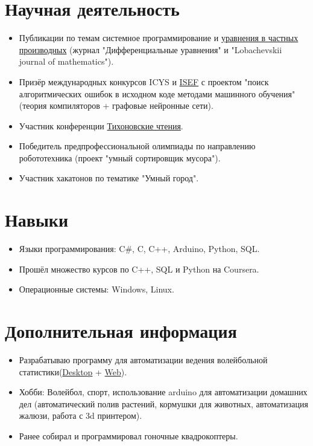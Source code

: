 \documentclass[a4paper,9pt]{article}
\begin{document}
	\section*{Научная деятельность}
	\begin{itemize}[left=0pt]
		\item Публикации по темам системное программирование и \href{https://journals.rcsi.science/0374-0641/issue/view/17906}{уравнения в частных производных} (журнал "Дифференциальные уравнения" и "Lobachevskii journal of mathematics").
		\item Призёр международных конкурсов ICYS  и \href{https://partner.projectboard.world/isef/project/soft004---search-for-algorithmic-errors}{ISEF} с проектом "поиск алгоритмических ошибок в исходном коде методами машинного обучения"(теория компиляторов + графовые нейронные сети).
		\item Участник конференции \href{https://cs.msu.ru/sites/cmc/files/attachs/tihonovskie_chteniya_el._versiya_0.pdf}{Тихоновские чтения}.
		\item Победитель предпрофессиональной олимпиады по направлению робототехника (проект "умный сортировщик мусора").
		\item Участник хакатонов по тематике "Умный город".
	\end{itemize}
	
	
	\section*{Навыки}
	\begin{itemize}[left=0pt]
		\item Языки программирования: C$\#$, C, C++, Arduino, Python, SQL.
		\item Прошёл множество курсов по C++, SQL и Python на Coursera.
		\item Операционные системы: Windows, Linux.
	\end{itemize}
	
	\section*{Дополнительная информация}
	\begin{itemize}[left=0pt]
		\item Разрабатываю программу для автоматизации ведения волейбольной статистики(\href{https://github.com/VasilchenkoDmitrii03/VolleyStat2.0_main}{Desktop} + \href{https://github.com/VasilchenkoDmitrii03/VolleyStat_web}{Web}).
		\item Хобби: Волейбол, спорт, использование arduino для автоматизации домашних дел (автоматический полив растений, кормушки для животных, автоматизация жалюзи, работа с 3d принтером).
		\item Ранее собирал и программировал гоночные квадрокоптеры.
		
	\end{itemize}
	
\end{document}
